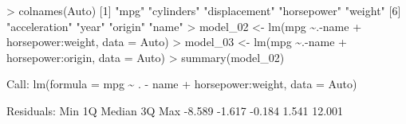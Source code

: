 \documentclass[
]{article}
\newenvironment{Shaded}{\begin{snugshade}}{\end{snugshade}}
\newcommand{\AttributeTok}[1]{\textcolor[rgb]{0.77,0.63,0.00}{#1}}
\newcommand{\DecValTok}[1]{\textcolor[rgb]{0.00,0.00,0.81}{#1}}
\newcommand{\FloatTok}[1]{\textcolor[rgb]{0.00,0.00,0.81}{#1}}
\newcommand{\FunctionTok}[1]{\textcolor[rgb]{0.00,0.00,0.00}{#1}}
\newcommand{\NormalTok}[1]{#1}
\newcommand{\OtherTok}[1]{\textcolor[rgb]{0.56,0.35,0.01}{#1}}
\newcommand{\SpecialCharTok}[1]{\textcolor[rgb]{0.00,0.00,0.00}{#1}}
\newcommand{\StringTok}[1]{\textcolor[rgb]{0.31,0.60,0.02}{#1}}
\begin{document}
\begin{Shaded}
\begin{Highlighting}[]
\SpecialCharTok{\textgreater{}} \FunctionTok{colnames}\NormalTok{(Auto)}
\NormalTok{[}\DecValTok{1}\NormalTok{] }\StringTok{"mpg"}          \StringTok{"cylinders"}    \StringTok{"displacement"} \StringTok{"horsepower"}   \StringTok{"weight"}      
\NormalTok{[}\DecValTok{6}\NormalTok{] }\StringTok{"acceleration"} \StringTok{"year"}         \StringTok{"origin"}       \StringTok{"name"}        
\SpecialCharTok{\textgreater{}}\NormalTok{ model\_02 }\OtherTok{\textless{}{-}} \FunctionTok{lm}\NormalTok{(mpg }\SpecialCharTok{\textasciitilde{}}\NormalTok{.}\SpecialCharTok{{-}}\NormalTok{name }\SpecialCharTok{+}\NormalTok{ horsepower}\SpecialCharTok{:}\NormalTok{weight, }\AttributeTok{data =}\NormalTok{ Auto)}
\SpecialCharTok{\textgreater{}}\NormalTok{ model\_03 }\OtherTok{\textless{}{-}} \FunctionTok{lm}\NormalTok{(mpg }\SpecialCharTok{\textasciitilde{}}\NormalTok{.}\SpecialCharTok{{-}}\NormalTok{name }\SpecialCharTok{+}\NormalTok{ horsepower}\SpecialCharTok{:}\NormalTok{origin, }\AttributeTok{data =}\NormalTok{ Auto)}
\SpecialCharTok{\textgreater{}} \FunctionTok{summary}\NormalTok{(model\_02)}

\NormalTok{Call}\SpecialCharTok{:}
\FunctionTok{lm}\NormalTok{(}\AttributeTok{formula =}\NormalTok{ mpg }\SpecialCharTok{\textasciitilde{}}\NormalTok{ . }\SpecialCharTok{{-}}\NormalTok{ name }\SpecialCharTok{+}\NormalTok{ horsepower}\SpecialCharTok{:}\NormalTok{weight, }\AttributeTok{data =}\NormalTok{ Auto)}

\NormalTok{Residuals}\SpecialCharTok{:}
\NormalTok{   Min     1Q Median     3Q    Max }
\SpecialCharTok{{-}}\FloatTok{8.589} \SpecialCharTok{{-}}\FloatTok{1.617} \SpecialCharTok{{-}}\FloatTok{0.184}  \FloatTok{1.541} \FloatTok{12.001} 


\end{Highlighting}
\end{Shaded}
\end{document}
